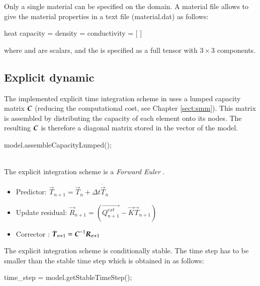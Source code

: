Only a single material can be specified on the domain. 
A material file allows to give the material properties in a text file (\eg material.dat) as follows:
\begin{cpp}
  heat %
  capacity = %
  density = %
  conductivity = [%
  ]
\end{cpp}
where  and  are scalars, and the  is specified as a 
full tensor with $3\times 3$ components.

\subsection{Explicit dynamic}

The implemented explicit  time integration scheme in \akantu  uses a lumped capacity
matrix $\boldsymbol{C}$ (reducing the computational  cost, see Chapter \ref{sect:smm}). 
This matrix is assembled by
distributing the capacity of each element onto its nodes. The resulting $\boldsymbol{C}$ is
therefore a diagonal matrix stored in the  vector of the model.

\begin{cpp}
  model.assembleCapacityLumped();
\end{cpp}

 \\

The explicit integration scheme is a  {\it Forward Euler} 
\cite{curnier92a}.

\begin{itemize}
\item Predictor: $\vec{T}_{n+1} = \vec{T}_{n} + \Delta t \dot{\vec{T}}_{n}$
\item Update residual: $\vec{R}_{n+1} = \left( \vec{Q^{ext}_{n+1}} - \vec{K}\vec{T}_{n+1} \right)$
\item Corrector : $\dot{\boldsymbol{T}}_{n+1} = \boldsymbol{C}^{-1} \boldsymbol{R}_{n+1}$
\end{itemize}

The explicit integration scheme is conditionally stable. The time step has to be
smaller than the stable time step which is obtained in \akantu as follows:

\begin{cpp}
  time_step = model.getStableTimeStep();
\end{cpp}

